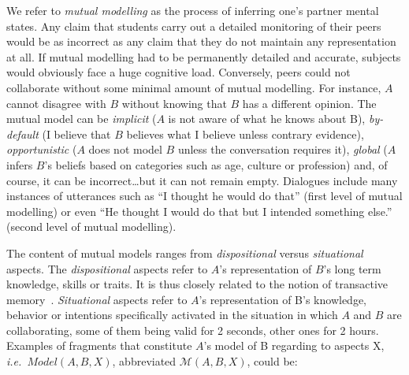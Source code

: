 \documentclass[natbib]{svjour3}
\newcommand{\ie}{{\textit{i.e.\ }}}
\newcommand{\model}[3]{{$\mathcal{M}(#1, #2, #3)$}}
\begin{document}
We refer to \emph{mutual modelling} as the process of inferring one's partner
mental states. Any claim that students carry out a detailed monitoring of their
peers would be as incorrect as any claim that they do not maintain any
representation at all. If mutual modelling had to be permanently detailed and
accurate, subjects would obviously face a huge cognitive load. Conversely, peers
could not collaborate without some minimal amount of mutual modelling. For
instance, $A$ cannot disagree with $B$ without knowing that $B$ has a different
opinion. The mutual model can be \emph{implicit} ($A$ is not aware of what he knows about
B), \emph{by-default} (I believe that $B$ believes what I believe unless contrary
evidence), \emph{opportunistic} ($A$ does not model $B$ unless the conversation requires
it), \emph{global} ($A$ infers $B$'s beliefs based on categories such as age, culture or
profession) and, of course, it can be incorrect\ldots but it can not remain empty.
Dialogues include many instances of utterances such as ``I thought he would do
that'' (first level of mutual modelling) or even ``He thought I would do that
but I intended something else.'' (second level of mutual modelling).

The content of mutual models ranges from \emph{dispositional} versus
\emph{situational} aspects. The \emph{dispositional} aspects refer to $A$'s
representation of $B$'s long term knowledge, skills or traits. It is thus closely
related to the notion of transactive memory~\citep{wegner1987transactive,
moreland1999transactive}.  \emph{Situational} aspects refer to $A$'s representation of
B's knowledge, behavior or intentions specifically activated in the situation in
which $A$ and $B$ are collaborating, some of them being valid for 2 seconds, other
ones for 2 hours. Examples of fragments that constitute $A$'s model of B
regarding to aspects X, \ie $Model(A,B,X)$, abbreviated \model{A}{B}{X}, could be:
\end{document}
